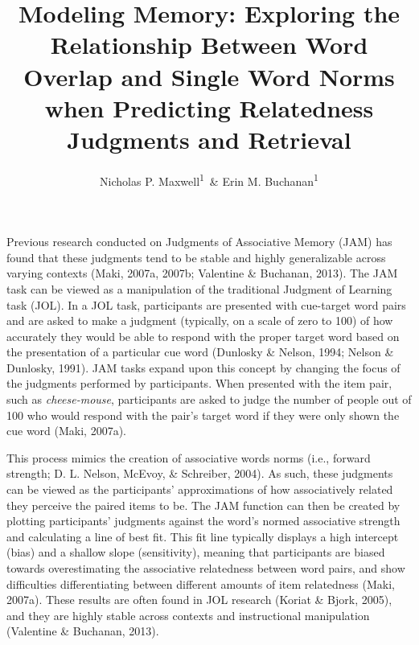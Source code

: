 \documentclass[english,man]{apa6}
\title{Modeling Memory: Exploring the Relationship Between Word Overlap and
Single Word Norms when Predicting Relatedness Judgments and Retrieval}
\author{Nicholas P. Maxwell\textsuperscript{1}~\& Erin M. Buchanan\textsuperscript{1}}
\affiliation{
    \vspace{0.5cm}
          \textsuperscript{1} Missouri State University  }
\theoremstyle{definition}
\theoremstyle{definition}
\theoremstyle{definition}
\theoremstyle{remark}
\begin{document}
\maketitle

\setcounter{secnumdepth}{0}



Previous research conducted on Judgments of Associative Memory (JAM) has
found that these judgments tend to be stable and highly generalizable
across varying contexts (Maki, 2007a, 2007b; Valentine \& Buchanan,
2013). The JAM task can be viewed as a manipulation of the traditional
Judgment of Learning task (JOL). In a JOL task, participants are
presented with cue-target word pairs and are asked to make a judgment
(typically, on a scale of zero to 100) of how accurately they would be
able to respond with the proper target word based on the presentation of
a particular cue word (Dunlosky \& Nelson, 1994; Nelson \& Dunlosky,
1991). JAM tasks expand upon this concept by changing the focus of the
judgments performed by participants. When presented with the item pair,
such as \emph{cheese-mouse}, participants are asked to judge the number
of people out of 100 who would respond with the pair's target word if
they were only shown the cue word (Maki, 2007a).

This process mimics the creation of associative words norms (i.e.,
forward strength; D. L. Nelson, McEvoy, \& Schreiber, 2004). As such,
these judgments can be viewed as the participants' approximations of how
associatively related they perceive the paired items to be. The JAM
function can then be created by plotting participants' judgments against
the word's normed associative strength and calculating a line of best
fit. This fit line typically displays a high intercept (bias) and a
shallow slope (sensitivity), meaning that participants are biased
towards overestimating the associative relatedness between word pairs,
and show difficulties differentiating between different amounts of item
relatedness (Maki, 2007a). These results are often found in JOL research
(Koriat \& Bjork, 2005), and they are highly stable across contexts and
instructional manipulation (Valentine \& Buchanan, 2013).
\end{document}
